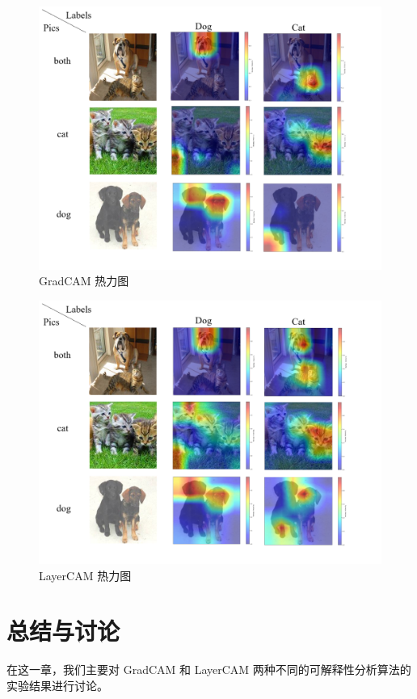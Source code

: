 \documentclass[supercite]{Experimental_Report}
\theoremstyle{definition}
\begin{document}
\begin{figure}[H]
	\begin{center}
		\includegraphics[scale=0.55]{../images/GradCAM热力图.png}
		\caption{GradCAM 热力图}
		\label{GradCAM热力图}
	\end{center}
\end{figure}
\begin{figure}[H]
	\begin{center}
		\includegraphics[scale=0.55]{../images/LayerCAM热力图.png}
		\caption{LayerCAM 热力图}
		\label{LayerCAM热力图}
	\end{center}
\end{figure}
\section{总结与讨论}
在这一章，我们主要对 GradCAM 和 LayerCAM 两种不同的可解释性分析算法的实验结果进行讨论。
\end{document}
